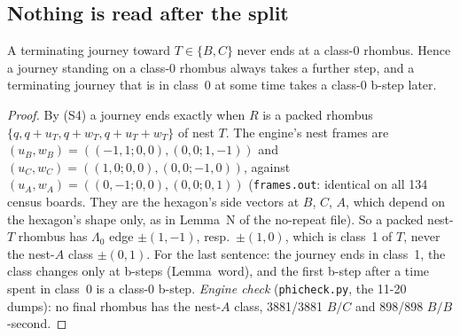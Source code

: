 \documentclass[11pt]{article}
\theoremstyle{definition}\newtheorem{definition}[theorem]{Definition}\newtheorem{remark}[theorem]{Remark}
\begin{document}
\subsection{Nothing is read after the split}
\begin{lemma}\label{lem:fin}
A terminating journey toward $T\in\{B,C\}$ never ends at a class-0 rhombus. Hence a journey standing on a class-0 rhombus always takes a further step, and a terminating journey that is in class~0 at some time takes a class-0 b-step later.
\end{lemma}
\begin{proof}
By (S4) a journey ends exactly when $R$ is a packed rhombus $\{q,q+u_T,q+w_T,q+u_T+w_T\}$ of nest $T$. The engine's nest frames are $(u_B,w_B)=((-1,1;0,0),(0,0;1,-1))$ and $(u_C,w_C)=((1,0;0,0),(0,0;-1,0))$, against $(u_A,w_A)=((0,-1;0,0),(0,0;0,1))$ (\texttt{frames.out}: identical on all 134 census boards. They are the hexagon's side vectors at $B$, $C$, $A$, which depend on the hexagon's shape only, as in Lemma~N of the no-repeat file).
So a packed nest-$T$ rhombus has $\Lambda_0$ edge $\pm(1,-1)$, resp.\ $\pm(1,0)$, which is class~1 of $T$, never the nest-$A$ class $\pm(0,1)$. For the last sentence: the journey ends in class~1, the class changes only at b-steps (Lemma~word), and the first b-step after a time spent in class~0 is a class-0 b-step.
\emph{Engine check} (\texttt{phicheck.py}, the 11-20 dumps): no final rhombus has the nest-$A$ class, 3881/3881 $B/C$ and 898/898 $B/B$-second.
\end{proof}
\end{document}
